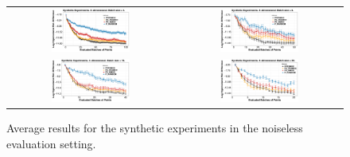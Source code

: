\begin{figure}[ht]
\begin{center}
\begin{tabular}{cc}
\includegraphics[width=0.49\textwidth]{Figures/ppesmoc/4D4B.pdf} &
\includegraphics[width=0.49\textwidth]{Figures/ppesmoc/4D8B.pdf}\\
\includegraphics[width=0.49\textwidth]{Figures/ppesmoc/4D10B.pdf} &
\includegraphics[width=0.49\textwidth]{Figures/ppesmoc/4D20B.pdf}
\end{tabular}
\caption{Average results for the synthetic experiments in the noiseless evaluation setting.}
\label{fig:ppesmoc_synthetic}
\end{center}
\end{figure}

